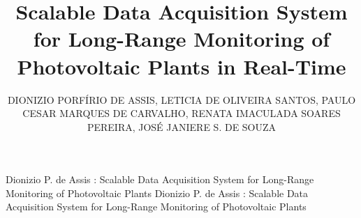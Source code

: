 \documentclass{ieeeaccess}
\begin{document}

\title{Scalable Data Acquisition System for Long-Range Monitoring of Photovoltaic Plants in Real-Time}

\author{
\uppercase{Dionizio Porfírio de Assis}, 
\uppercase{Leticia de Oliveira Santos}, 
\uppercase{Paulo Cesar Marques de Carvalho}, 
\uppercase{Renata Imaculada Soares Pereira}, 
\uppercase{José Janiere S. de Souza}
}

\address[1]{Department of Electrical Engineering, Federal University of Ceará (UFC), Fortaleza, Ceará, Brazil \\
(e-mails: dionisioassis80@gmail.com; leticia@fisica.ufc.br; carvalho@dee.ufc.br)}

\address[2]{Department of Electronics, Federal Institute of Alagoas - Arapiraca campus (IFAL), Arapiraca, Alagoas, Brazil \\
(e-mail: renata.pereira@ifal.edu.br)}

\address[3]{Federal Institute of Education, Science and Technology of Ceará (IFCE), Cedro Campus, Cedro, Ceará, Brazil \\
(e-mail: janieresouza@dee.ufc.br)}


\markboth
{Dionizio P. de Assis \headeretal: Scalable Data Acquisition System for Long-Range Monitoring of Photovoltaic Plants}
{Dionizio P. de Assis \headeretal: Scalable Data Acquisition System for Long-Range Monitoring of Photovoltaic Plants}

\end{document}
